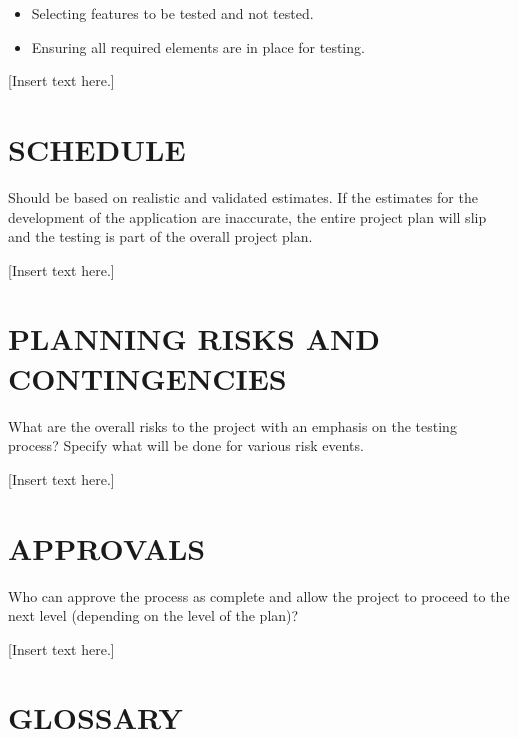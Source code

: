 {{\begin{itemize}
\item Selecting features to be tested and not tested.
\item Ensuring all required elements are in place for testing. 
\end{itemize}
}
{\color{black}
[Insert text here.]}

\section[SCHEDULE]{\bfseries\color{black} SCHEDULE}
{\itshape\color{black}

Should be based on realistic and validated estimates. If the estimates
for the development of the application are inaccurate, the entire
project plan will slip and the testing is part of the overall project plan.

}
{\color{black}
[Insert text here.]}

\section[PLANNING RISKS AND CONTINGENCIES]{\bfseries\color{black}
	 PLANNING RISKS AND CONTINGENCIES}
{\itshape\color{black}

What are the overall risks to the project with an emphasis on the
testing process? Specify what will be done for various risk events.

}
{\color{black}
[Insert text here.]}

\section[APPROVALS]{\bfseries\color{black} APPROVALS}
{\itshape\color{black}

Who can approve the process as complete and allow the project to
proceed to the next level (depending on the level of the plan)? 

}
{\color{black}
[Insert text here.]}

\section[GLOSSARY]{\bfseries\color{black} GLOSSARY}

{\itshape\color{black}

}}
